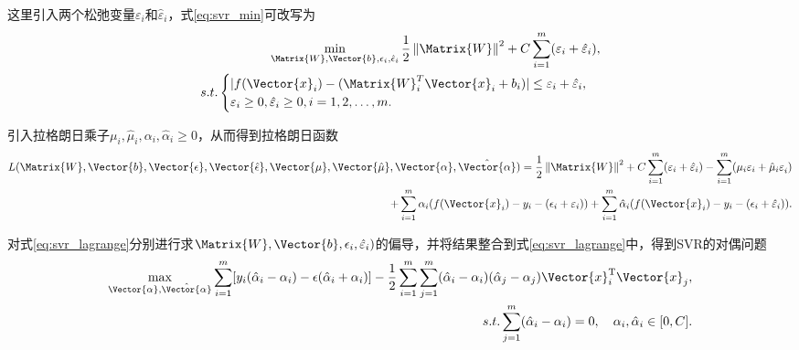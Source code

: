 这里引入两个松弛变量$\varepsilon_i$和$\hat{\varepsilon}_i$，式\ref{eq:svr_min}可改写为
\begin{equation}
  \label{eq:svr_min_v2}
  \begin{split}
  \min\limits_{\Matrix{W},\Vector{b},\epsilon_i,\hat{\epsilon}_i}\frac{1}{2}\left\|\Matrix{W}\right\|^{2}+C\sum_{i=1}^{m}(\varepsilon_i+\hat{\varepsilon}_i),\\
  s.t. 
  \begin{cases}
  |f(\Vector{x}_i)-(\Matrix{W}_i^{T}\Vector{x}_i+b_i)|\le \varepsilon_i+\hat{\varepsilon}_i,\\
  \varepsilon_i\ge 0, \hat{\varepsilon}_i\ge 0, i=1,2,\ldots,m.
  \end{cases}
  \end{split}
\end{equation}

引入拉格朗日乘子$\mu_i,\hat{\mu}_i,\alpha_i,\hat{\alpha}_i\ge 0$，从而得到拉格朗日函数
\begin{equation}
  \label{eq:svr_lagrange}
  \begin{split}
  L(\Matrix{W},\Vector{b},\Vector{\epsilon},\Vector{\hat{\epsilon}},\Vector{\mu},\Vector{\hat{\mu}},\Vector{\alpha},\hat{\Vector{\alpha}})=\frac{1}{2}\left\|\Matrix{W}\right\|^{2}+C\sum_{i=1}^{m}(\varepsilon_i+\hat{\varepsilon}_i)-\sum_{i=1}^{m}(\mu_{i}\varepsilon_i+{\hat{\mu}_i\varepsilon}_i)\\
  +\sum_{i=1}^{m}\alpha_i(f(\Vector{x}_i)-y_i-(\epsilon_i+\varepsilon_i))+\sum_{i=1}^{m}\hat{\alpha}_i(f(\Vector{x}_i)-y_i-(\epsilon_i+\hat{\varepsilon}_i)).
  \end{split}
\end{equation}

对式\ref{eq:svr_lagrange}分别进行求$\Matrix{W},\Vector{b},\epsilon_i,\hat{\varepsilon}_i)$的偏导，并将结果整合到式\ref{eq:svr_lagrange}中，得到SVR的对偶问题
\begin{equation}
  \label{eq:svr_dual}
  \begin{split}
  \max\limits_{\Vector{\alpha},\hat{\Vector{\alpha}}}\sum_{i=1}^{m}[y_i(\hat{\alpha}_i-\alpha_i)-\epsilon(\hat{\alpha}_i+\alpha_i)]-\frac{1}{2}\sum_{i=1}^{m}\sum_{j=1}^{m}(\hat{\alpha}_i-\alpha_i)(\hat{\alpha}_j-\alpha_j)\Vector{x}_i^{\text{T}}\Vector{x}_j,\\
  s.t. 
  \sum_{j=1}^{m}(\hat{\alpha}_i-\alpha_i)=0, \quad \alpha_i, \hat{\alpha}_i\in[0,C].
  \end{split}
\end{equation}

